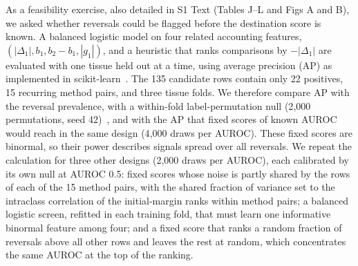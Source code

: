 \documentclass[10pt,letterpaper]{article}
\begin{document}
As a feasibility exercise, also detailed in S1 Text (Tables J--L and Figs A and B), we asked whether reversals could be flagged before the destination score is known. A balanced logistic model on four related accounting features, $(|\Delta_1|,b_1,b_2-b_1,|g_1|)$, and a heuristic that ranks comparisons by $-|\Delta_1|$ are evaluated with one tissue held out at a time, using average precision (AP) as implemented in scikit-learn~\cite{pedregosa2011sklearn}. The 135 candidate rows contain only 22 positives, 15 recurring method pairs, and three tissue folds. We therefore compare AP with the reversal prevalence, with a within-fold label-permutation null (2{,}000 permutations, seed 42)~\cite{ojala2010permutation}, and with the AP that fixed scores of known AUROC would reach in the same design (4{,}000 draws per AUROC). These fixed scores are binormal, so their power describes signals spread over all reversals. We repeat the calculation for three other designs (2{,}000 draws per AUROC), each calibrated by its own null at AUROC 0.5: fixed scores whose noise is partly shared by the rows of each of the 15 method pairs, with the shared fraction of variance set to the intraclass correlation of the initial-margin ranks within method pairs; a balanced logistic screen, refitted in each training fold, that must learn one informative binormal feature among four; and a fixed score that ranks a random fraction of reversals above all other rows and leaves the rest at random, which concentrates the same AUROC at the top of the ranking.
\end{document}
